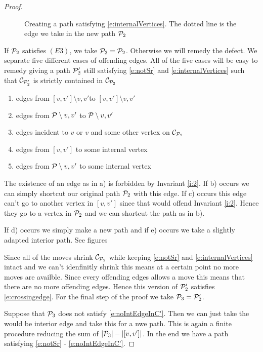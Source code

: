 \documentclass[a4paper]{article}
\theoremstyle{definition}
\begin{document}
\begin{proof}
\begin{figure}
    \caption{Creating a path satisfying \ref{e:internalVertices}. The dotted line is the edge we take in the new path $\P_2$}\label{fig:E2}
\end{figure}

\newcommand{\intvv}{\ensuremath{[v,v']\setminus{v,v'}}}
\newcommand{\intP}{\ensuremath{\P\setminus{v,v'}}}

If $\P_2$ satisfies $(E3)$, we take $\P_3 = \P_2$. Otherwise we will remedy the defect. We separate five different cases of offending edges. All of the five cases will be easy to remedy giving a path $\P'_2$ still satisfying \ref{e:notSr} and \ref{e:internalVertices} such that $\C_{\P'_2}$ is strictly contained in $\C_{\P_2}$ %
\begin{enumerate}
 \renewcommand*{\labelenumi}{\alph{enumi})}%
 \renewcommand*{\theenumi}{\alph{enumi})}%
 \item edges from \intvv to $\intvv$
 \item edges from $\intP$ to $\intP$
 \item edges incident to $v$ or $v$ and some other vertex on $\C_{\P_2}$
 \item edges from $[v,v']$ to some internal vertex 
 \item edges from $\intP$ to some internal vertex
\end{enumerate}

The existence of an edge as in a) is forbidden by Invariant \ref{i:2}. If b) occurs we can simply shortcut our original path $\P_2$ with this edge. If c) occurs this edge can't go to another vertex in $[v,v']$ since that would offend Invariant \ref{i:2}. Hence they go to a vertex in $\P_2$ and we can shortcut the path as in b).

If d) occurs we simply make a new path and if e) occurs we take a slightly adapted interior path. See figures


Since all of the moves shrink $\C_{\P_2}$ while keeping \ref{e:notSr} and \ref{e:internalVertices} intact and we can't idenfinitly shrink this means at a certain point no more moves are availble. Since every offending edges allows a move this means that there are no more offending edges. Hence this version of $\P'_2$ satisfies \ref{e:crossingedge}. For the final step of the proof we take $\P_3 = \P'_2$.


Suppose that $\P_3$ does not satisfy \ref{e:noIntEdgeInC'}. Then we can just take the would be interior edge and take this for a nwe path. This is again a finite procedure reducing the sum of $|\P_3| -|[v,v']|$. In the end we have a path satisfying \ref{e:notSr} - \ref{e:noIntEdgeInC'}.



\end{proof}
\end{document}
